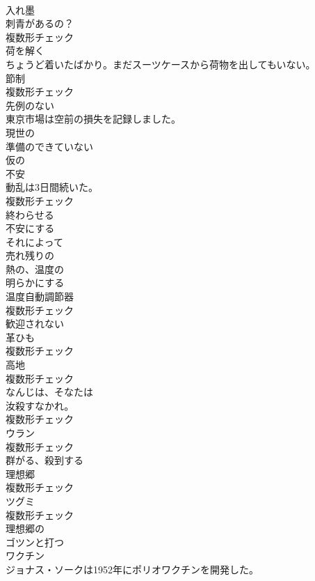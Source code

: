 \documentclass[8pt]{extreport}
\begin{document}
\begin{CJK}{UTF8}{min}
\\	[名詞]	入れ墨	
\\	刺青があるの？	
\\	複数形チェック
\\	[動詞]	荷を解く	
\\	ちょうど着いたばかり。まだスーツケースから荷物を出してもいない。	
\\	[名詞]	節制	
\\	複数形チェック
\\	[形容詞]	先例のない	
\\	東京市場は空前の損失を記録しました。	
\\	[形容詞]	現世の	
\\	[形容詞]	準備のできていない	
\\	[形容詞]	仮の	
\\	[名詞]	不安	
\\	動乱は3日間続いた。	
\\	複数形チェック
\\	[動詞]	終わらせる	
\\	[動詞]	不安にする	
\\	[副詞]	それによって	
\\	[形容詞]	売れ残りの	
\\	[形容詞]	熱の、温度の	
\\	[動詞]	明らかにする	
\\	[名詞]	温度自動調節器	
\\	複数形チェック
\\	[形容詞]	歓迎されない	
\\	[名詞]	革ひも	
\\	複数形チェック
\\	[名詞]	高地	
\\	複数形チェック
\\	[名詞]	なんじは、そなたは	
\\	汝殺すなかれ。	
\\	複数形チェック
\\	[名詞]	ウラン	
\\	複数形チェック
\\	[動詞]	群がる、殺到する	
\\	[名詞]	理想郷	
\\	複数形チェック
\\	[名詞]	ツグミ	
\\	複数形チェック
\\	[形容詞]	理想郷の	
\\	[動詞]	ゴツンと打つ	
\\	[名詞]	ワクチン	
\\	ジョナス・ソークは1952年にポリオワクチンを開発した。	

\end{CJK}
\end{document}
